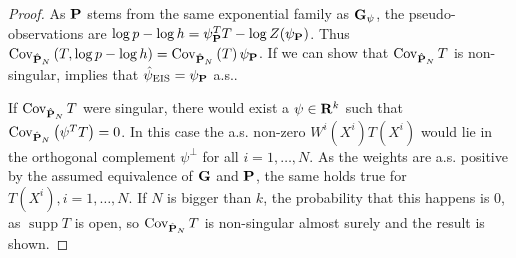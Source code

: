 \begin{proof}
   As $\P$ stems from the same exponential family as $\G_{\psi}$, the pseudo-observations are $\log p - \log h = \psi_{\P}^T T - \log Z(\psi_{\P})$. Thus $\cov_{\hat \P_{N}} \left( T, \log p - \log h \right) = \cov_{\hat \P_{N}} \left( T \right)\psi_{\P}$. 
   If we can show that $\cov_{\hat\P_{N}} T$ is non-singular,  implies that $\hpeis = \psi_{\P}$ a.s.. 

   If $\cov_{\hat \P_{N}} T$ were singular, there would exist a $\psi \in \R^{k}$ such that $\cov_{\hat \P_{N}} \left( \psi^{T}T \right) = 0$. In this case the a.s. non-zero $W^{i}(X^{i}) T(X^{i})$ would lie in the orthogonal complement $\psi^{\perp}$ for all $i = 1, \dots, N$. As the weights are a.s. positive by the assumed equivalence of $\G$ and $\P$, the same holds true for $T(X^{i}), i = 1,\dots, N$.
   If $N$ is bigger than $k$, the probability that this happens is $0$, as $\operatorname{supp} T $ is open, so $\cov_{\hat \P_{N}} T$ is non-singular almost surely and the result is shown.
    
\end{proof}



\begin{theorem}
    \label{thm:eis-consistent}
\end{theorem}

